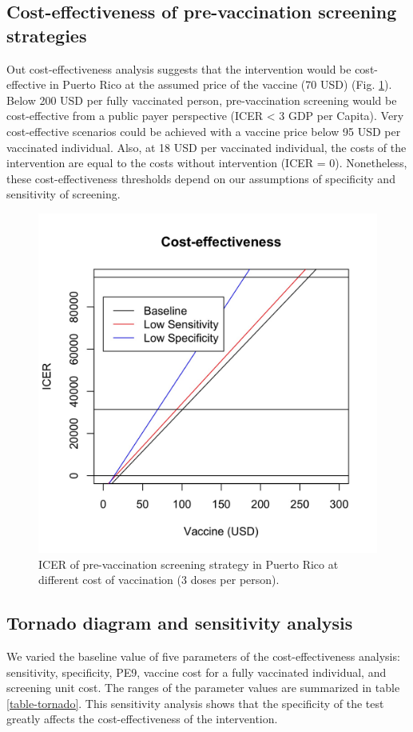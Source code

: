 \documentclass[12pt]{article}
\begin{document}
\subsection{Cost-effectiveness of pre-vaccination screening strategies}
Out cost-effectiveness analysis suggests that the intervention would be cost-effective in Puerto Rico at the assumed price of the vaccine (70 USD) (Fig. \ref{fig-ICER}). Below 200 USD per fully vaccinated person, pre-vaccination screening would be cost-effective from a public payer perspective (ICER < 3 GDP per Capita). Very cost-effective scenarios could be achieved with a vaccine price below 95 USD per vaccinated individual. Also, at 18 USD per vaccinated individual, the costs of the intervention are equal to the costs without intervention (ICER = 0). Nonetheless, these cost-effectiveness thresholds depend on our assumptions of specificity and sensitivity of screening. 


\begin{figure}[H]
  \centering
  \includegraphics[width=.7\linewidth]{../analysis/figures/report_figure_ICER.jpeg}
  \caption{\label{fig-ICER}ICER of pre-vaccination screening strategy in Puerto Rico at different cost of vaccination (3 doses per person).}  
\end{figure}

\subsection{Tornado diagram and sensitivity analysis}
We varied the baseline value of five parameters of the cost-effectiveness analysis: sensitivity, specificity, PE9, vaccine cost for a fully vaccinated individual, and screening unit cost. The ranges of the parameter values are summarized in table \ref{table-tornado}. This sensitivity analysis shows that the specificity of the test greatly affects the cost-effectiveness of the intervention. 
\end{document}
